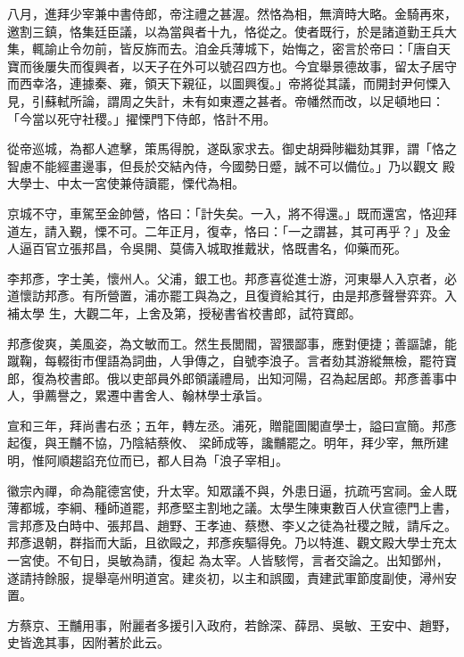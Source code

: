 \begin{pinyinscope}
 八月，進拜少宰兼中書侍郎，帝注禮之甚渥。然恪為相，無濟時大略。金騎再來，邀割三鎮，恪集廷臣議，以為當與者十九，恪從之。使者既行，於是諸道勤王兵大集，輒諭止令勿前，皆反旆而去。洎金兵薄城下，始悔之，密言於帝曰：「唐自天
 寶而後屢失而復興者，以天子在外可以號召四方也。今宜舉景德故事，留太子居守而西幸洛，連據秦、雍，領天下親征，以圖興復。」帝將從其議，而開封尹何慄入見，引蘇軾所論，謂周之失計，未有如東遷之甚者。帝幡然而改，以足頓地曰：「今當以死守社稷。」擢慄門下侍郎，恪計不用。



 從帝巡城，為都人遮擊，策馬得脫，遂臥家求去。御史胡舜陟繼劾其罪，謂「恪之智慮不能經畫邊事，但長於交結內侍，今國勢日蹙，誠不可以備位。」乃以觀文
 殿大學士、中太一宮使兼侍讀罷，慄代為相。



 京城不守，車駕至金帥營，恪曰：「計失矣。一入，將不得還。」既而還宮，恪迎拜道左，請入覲，慄不可。二年正月，復幸，恪曰：「一之謂甚，其可再乎？」及金人逼百官立張邦昌，令吳開、莫儔入城取推戴狀，恪既書名，仰藥而死。



 李邦彥，字士美，懷州人。父浦，銀工也。邦彥喜從進士游，河東舉人入京者，必道懷訪邦彥。有所營置，浦亦罷工與為之，且復資給其行，由是邦彥聲譽弈弈。入補太學
 生，大觀二年，上舍及第，授秘書省校書郎，試符寶郎。



 邦彥俊爽，美風姿，為文敏而工。然生長閭閻，習猥鄙事，應對便捷；善謳謔，能蹴鞠，每輟街市俚語為詞曲，人爭傳之，自號李浪子。言者劾其游縱無檢，罷符寶郎，復為校書郎。俄以吏部員外郎領議禮局，出知河陽，召為起居郎。邦彥善事中人，爭薦譽之，累遷中書舍人、翰林學士承旨。



 宣和三年，拜尚書右丞；五年，轉左丞。浦死，贈龍圖閣直學士，謚曰宣簡。邦彥起復，與王黼不協，乃陰結蔡攸、
 梁師成等，讒黼罷之。明年，拜少宰，無所建明，惟阿順趨諂充位而已，都人目為「浪子宰相」。



 徽宗內禪，命為龍德宮使，升太宰。知眾議不與，外患日逼，抗疏丐宮祠。金人既薄都城，李綱、種師道罷，邦彥堅主割地之議。太學生陳東數百人伏宣德門上書，言邦彥及白時中、張邦昌、趙野、王孝迪、蔡懋、李乂之徒為社稷之賊，請斥之。邦彥退朝，群指而大詬，且欲毆之，邦彥疾驅得免。乃以特進、觀文殿大學士充太一宮使。不旬日，吳敏為請，復起
 為太宰。人皆駭愕，言者交論之。出知鄧州，遂請持餘服，提舉亳州明道宮。建炎初，以主和誤國，責建武軍節度副使，潯州安置。



 方蔡京、王黼用事，附麗者多援引入政府，若餘深、薛昂、吳敏、王安中、趙野，史皆逸其事，因附著於此云。




\end{pinyinscope}
